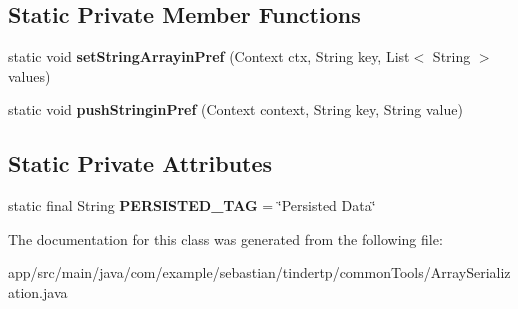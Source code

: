 \subsection*{Static Private Member Functions}
\begin{DoxyCompactItemize}
\item 
static void {\bfseries set\+String\+Arrayin\+Pref} (Context ctx, String key, List$<$ String $>$ values)\hypertarget{classcom_1_1example_1_1sebastian_1_1tindertp_1_1commonTools_1_1ArraySerialization_a5e7b7c56bf40ca5344db9806615e81ca}{}\label{classcom_1_1example_1_1sebastian_1_1tindertp_1_1commonTools_1_1ArraySerialization_a5e7b7c56bf40ca5344db9806615e81ca}

\item 
static void {\bfseries push\+Stringin\+Pref} (Context context, String key, String value)\hypertarget{classcom_1_1example_1_1sebastian_1_1tindertp_1_1commonTools_1_1ArraySerialization_a78eaa44f55be648142894e06f6ee089f}{}\label{classcom_1_1example_1_1sebastian_1_1tindertp_1_1commonTools_1_1ArraySerialization_a78eaa44f55be648142894e06f6ee089f}

\end{DoxyCompactItemize}
\subsection*{Static Private Attributes}
\begin{DoxyCompactItemize}
\item 
static final String {\bfseries P\+E\+R\+S\+I\+S\+T\+E\+D\+\_\+\+T\+AG} = \char`\"{}Persisted Data\char`\"{}\hypertarget{classcom_1_1example_1_1sebastian_1_1tindertp_1_1commonTools_1_1ArraySerialization_ac97509cc0f256f877558c94a3c690ea5}{}\label{classcom_1_1example_1_1sebastian_1_1tindertp_1_1commonTools_1_1ArraySerialization_ac97509cc0f256f877558c94a3c690ea5}

\end{DoxyCompactItemize}


The documentation for this class was generated from the following file\+:\begin{DoxyCompactItemize}
\item 
app/src/main/java/com/example/sebastian/tindertp/common\+Tools/Array\+Serialization.\+java\end{DoxyCompactItemize}
